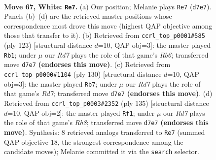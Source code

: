 \documentclass[11pt]{article}
\begin{document}
\clearpage

\begin{figure}[p]\centering
\begin{subfigure}{0.46\textwidth}\centering
\resizebox{\linewidth}{!}{%
\newchessgame
\chessboard[
  setfen={5rk1/P2R4/8/8/8/6K1/8/8 w - - 3 67},
  showmover=false,
  pgfstyle=straightmove, color=movearrow, markmove={d7-e7}
]}
\caption{}
\end{subfigure}\hfill
\begin{subfigure}{0.46\textwidth}\centering
\resizebox{\linewidth}{!}{%
\newchessgame
\chessboard[
  setfen={8/8/4pk2/7R/5P1K/1r6/8/8 b - - 6 62},
  showmover=false,
  pgfstyle=straightmove, color=movearrow, markmove={b3-b1}
]}
\caption{}
\end{subfigure}
\\[4pt]
\begin{subfigure}{0.46\textwidth}\centering
\resizebox{\linewidth}{!}{%
\newchessgame
\chessboard[
  setfen={5rk1/3R4/1p4K1/6P1/8/8/8/8 w - - 1 66},
  showmover=false,
  pgfstyle=straightmove, color=movearrow, markmove={d7-b7}
]}
\caption{}
\end{subfigure}\hfill
\begin{subfigure}{0.46\textwidth}\centering
\resizebox{\linewidth}{!}{%
\newchessgame
\chessboard[
  setfen={8/1K6/1R6/p7/k1P5/8/8/7r b - - 2 68},
  showmover=false,
  pgfstyle=straightmove, color=movearrow, markmove={h1-f1}
]}
\caption{}
\end{subfigure}
\caption{\textbf{Move 67, White: \texttt{Re7}.} (a) Our position; Melanie plays \texttt{Re7} (\texttt{d7e7}). Panels (b)--(d) are the retrieved master positions whose correspondence most drove this move (highest QAP objective among those that transfer to it). (b) Retrieved from \texttt{ccrl\_top\_p0001\#585} (ply 123) [structural distance $d$=10, QAP obj=3]: the master played \texttt{Rb1}; under $\mu$ our \emph{Rd7} plays the role of that game's \emph{Rb6}; transferred move \texttt{d7e7} \textbf{(endorses this move)}. (c) Retrieved from \texttt{ccrl\_top\_p0000\#1104} (ply 130) [structural distance $d$=10, QAP obj=3]: the master played \texttt{Rb7}; under $\mu$ our \emph{Rd7} plays the role of that game's \emph{Rd7}; transferred move \texttt{d7e7} \textbf{(endorses this move)}. (d) Retrieved from \texttt{ccrl\_top\_p0003\#2352} (ply 135) [structural distance $d$=10, QAP obj=2]: the master played \texttt{Rf1}; under $\mu$ our \emph{Rd7} plays the role of that game's \emph{Rh8}; transferred move \texttt{d7e7} \textbf{(endorses this move)}. Synthesis: 8 retrieved analogs transferred to \texttt{Re7} (summed QAP objective 18, the strongest correspondence among the candidate moves); Melanie committed it via the \texttt{search} selector.}
\label{fig:thought-m132}
\end{figure}
\end{document}
